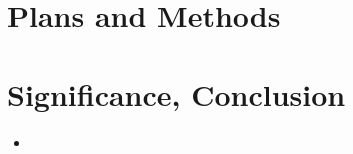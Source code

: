 \documentclass[8pt]{article}
\begin{document}
\section{Plans and Methods}

\section{Significance, Conclusion}

\begin{itemize}
    \item 
\end{itemize}



\end{document}
